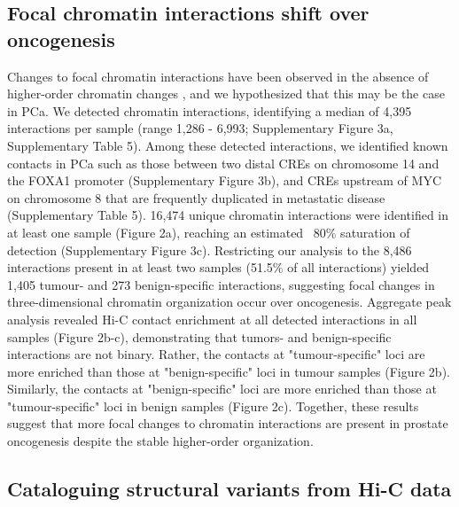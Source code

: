 \subsection{Focal chromatin interactions shift over oncogenesis}

Changes to focal chromatin interactions have been observed in the absence of higher-order chromatin changes \cite{taktakayamaTransitionQuiescentActivated2021,johnstoneLargeScaleTopologicalChanges2020}, and we hypothesized that this may be the case in PCa.
We detected chromatin interactions, identifying a median of 4,395 interactions per sample (range 1,286 - 6,993; Supplementary Figure 3a, Supplementary Table 5).
Among these detected interactions, we identified known contacts in PCa such as those between two distal CREs on chromosome 14 and the FOXA1 promoter \cite{zhouNoncodingMutationsTarget2020} (Supplementary Figure 3b), and CREs upstream of MYC on chromosome 8 that are frequently duplicated in metastatic disease \cite{quigleyGenomicHallmarksStructural2018} (Supplementary Table 5).
16,474 unique chromatin interactions were identified in at least one sample (Figure 2a), reaching an estimated ~80\% saturation of detection (Supplementary Figure 3c).
Restricting our analysis to the 8,486 interactions present in at least two samples (51.5\% of all interactions) yielded 1,405 tumour- and 273 benign-specific interactions, suggesting focal changes in three-dimensional chromatin organization occur over oncogenesis.
Aggregate peak analysis revealed Hi-C contact enrichment at all detected interactions in all samples (Figure 2b-c), demonstrating that tumors- and benign-specific interactions are not binary.
Rather, the contacts at "tumour-specific" loci are more enriched than those at "benign-specific" loci in tumour samples (Figure 2b).
Similarly, the contacts at "benign-specific" loci are more enriched than those at "tumour-specific" loci in benign samples (Figure 2c).
Together, these results suggest that more focal changes to chromatin interactions are present in prostate oncogenesis despite the stable higher-order organization.

\subsection{Cataloguing structural variants from Hi-C data}


